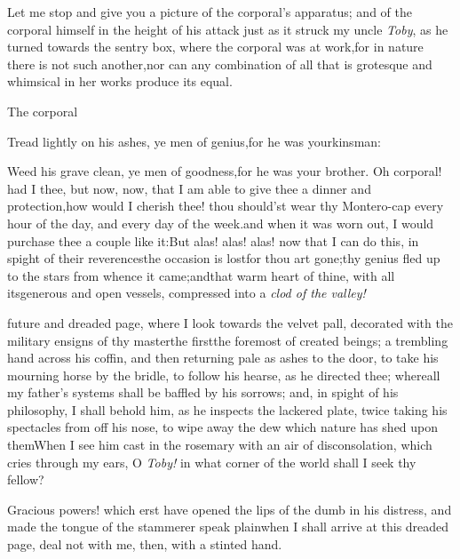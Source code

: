 \documentclass{article}
\begin{document}
Let me stop and give you a picture of the corporal’s apparatus; and of the corporal
himself in the height of his attack just as it struck my uncle \textit{Toby}, as he
turned towards the sentry box, where the corporal was at work,\tsh for in nature
there is not such another,\tsh\break nor can any combination of all that is
grotesque and whimsical in her works produce its equal.

The corporal\tsh\etp{}

\tsh Tread lightly on his ashes, ye men of
genius,\tsh for he was your\break kinsman:

Weed his grave clean, ye men of goodness,\tsk for he was your
brother.\tsk\break
Oh corporal! had I thee, but now,\tsk\break
now, that I am able to give thee a dinner and
protection,\tsk how would I che\-rish thee! thou should’st
wear thy Mon\-tero-cap every hour of the day, and\break
every day of the week.\tsk and when it was worn out, I would purchase thee a
couple like it:\tsh But alas! alas! alas!\break
now that I can do this, in spight of their reverences\tsk the occasion is
lost\tsk for thou art gone;\tsk thy genius fled up to the stars
from whence it came;\tsk and\break that warm heart of thine, with all
its\break generous and open vessels, compressed into a \textit{clod of the
valley!}

\noindent
{}
future and dreaded page, where I look towards the velvet pall, decorated
with the military ensigns of thy master\tsk the\break
first\tsk the foremost of created beings;\break
{}
\break
a trembling hand across his coffin, and\break
then returning pale as ashes to the door, to take his mourning horse by the bridle,
to follow his hearse, as he directed thee;\break
\tsh where\tsk all my father’s systems
shall be baffled by his sorrows; and, in spight\break
of his philosophy, I shall behold
him, as he inspects the lackered plate, twice taking his spectacles from off his
nose, to wipe away the dew which nature has shed upon them\tsh When I see him cast
in the rosemary with an air of disconsolation, which cries through my ears,\break
\tsh O \textit{Toby!} in what corner of the world shall I seek
thy fellow?\etp{}

\tsh Gracious powers! which erst\break
have opened the lips of the dumb in his\break
distress, and made the tongue of the\break
stammerer speak plain\tsk when I shall\break
arrive at this dreaded page, deal not\break
with me, then, with a stinted hand.
\end{document}
